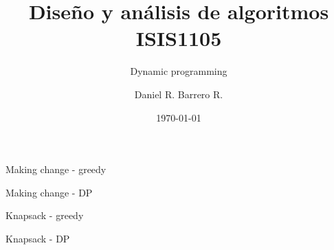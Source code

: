 \documentclass{beamer}
\title{Diseño y análisis de algoritmos\\ ISIS1105}
\subtitle{Dynamic programming}
\author{Daniel R. Barrero R.}
\date{\today}
\begin{document}
\frame{\titlepage}

%

\begin{frame}{Making change - greedy}
\end{frame}

%

\begin{frame}{Making change - DP}
\end{frame}

%

\begin{frame}{Knapsack - greedy}
\end{frame}

%

\begin{frame}{Knapsack - DP}
\end{frame}
\end{document}
